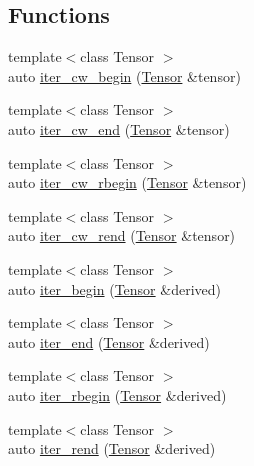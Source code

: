 \subsection*{Functions}
\begin{DoxyCompactItemize}
\item 
{\footnotesize template$<$class Tensor $>$ }\\auto \hyperlink{namespacebc_1_1tensors_1_1iterators_a8b8d5f3a94b1ad2e8e06ddff1cbb83be}{iter\+\_\+cw\+\_\+begin} (\hyperlink{namespacebc_a659391e47ab612be3ba6c18cf9c89159}{Tensor} \&tensor)
\item 
{\footnotesize template$<$class Tensor $>$ }\\auto \hyperlink{namespacebc_1_1tensors_1_1iterators_a27bc0ad8dd49827fd98426df362798d5}{iter\+\_\+cw\+\_\+end} (\hyperlink{namespacebc_a659391e47ab612be3ba6c18cf9c89159}{Tensor} \&tensor)
\item 
{\footnotesize template$<$class Tensor $>$ }\\auto \hyperlink{namespacebc_1_1tensors_1_1iterators_a53c8943b4ce77f69fe9ac2e7c27c1536}{iter\+\_\+cw\+\_\+rbegin} (\hyperlink{namespacebc_a659391e47ab612be3ba6c18cf9c89159}{Tensor} \&tensor)
\item 
{\footnotesize template$<$class Tensor $>$ }\\auto \hyperlink{namespacebc_1_1tensors_1_1iterators_aa659f3aedac1544e30c9f6bba811b084}{iter\+\_\+cw\+\_\+rend} (\hyperlink{namespacebc_a659391e47ab612be3ba6c18cf9c89159}{Tensor} \&tensor)
\item 
{\footnotesize template$<$class Tensor $>$ }\\auto \hyperlink{namespacebc_1_1tensors_1_1iterators_a9c925f805ae73b63485c066ba67cdb81}{iter\+\_\+begin} (\hyperlink{namespacebc_a659391e47ab612be3ba6c18cf9c89159}{Tensor} \&derived)
\item 
{\footnotesize template$<$class Tensor $>$ }\\auto \hyperlink{namespacebc_1_1tensors_1_1iterators_a150207dbd04324121e494c8745c8c01d}{iter\+\_\+end} (\hyperlink{namespacebc_a659391e47ab612be3ba6c18cf9c89159}{Tensor} \&derived)
\item 
{\footnotesize template$<$class Tensor $>$ }\\auto \hyperlink{namespacebc_1_1tensors_1_1iterators_a3f743f477e49a0711119adb34e56c5fc}{iter\+\_\+rbegin} (\hyperlink{namespacebc_a659391e47ab612be3ba6c18cf9c89159}{Tensor} \&derived)
\item 
{\footnotesize template$<$class Tensor $>$ }\\auto \hyperlink{namespacebc_1_1tensors_1_1iterators_aecd2f684f561e9b78f7e71f0dbb09e01}{iter\+\_\+rend} (\hyperlink{namespacebc_a659391e47ab612be3ba6c18cf9c89159}{Tensor} \&derived)
\end{DoxyCompactItemize}


